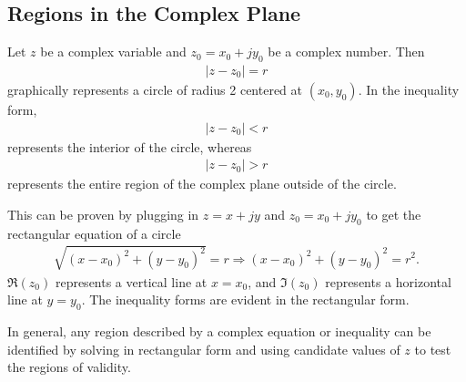 \documentclass{report}
\begin{document}
\subsection*{Regions in the Complex Plane}
Let $z$ be a complex variable and $z_0=x_0+jy_0$ be a complex number. Then 
\begin{align}
    |z-z_0| = r
\end{align} 
graphically represents a circle of radius 2 centered at $(x_0,y_0)$. In the inequality form,
\begin{align}
    |z-z_0| < r
\end{align} 
represents the interior of the circle, whereas 
\begin{align}
    |z-z_0| > r
\end{align} 
represents the entire region of the complex plane outside of the circle. 
\begin{center}
\end{center}
This can be proven by plugging in $z=x+jy$ and $z_0=x_0+jy_0$ to get the rectangular equation of a circle
\begin{align}
    \sqrt{(x-x_0)^2+(y-y_0)^2} = r \Longrightarrow (x-x_0)^2+(y-y_0)^2 = r^2.
\end{align} 
$\Re(z_0)$ represents a vertical line at $x=x_0$, and $\Im(z_0)$ represents a horizontal line at $y=y_0$. The inequality forms 
are evident in the rectangular form.
\begin{center}
\end{center}
In general, any region described by a complex equation or inequality can be identified by solving in rectangular form and using candidate values of $z$ 
to test the regions of validity.
\end{document}
